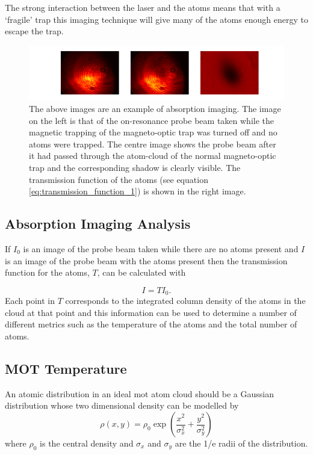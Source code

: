 The strong interaction between the laser and the atoms means that with a `fragile' trap this imaging technique will give many of the atoms enough energy to escape the trap.

\begin{figure}[h]
\centering
\includegraphics[width=18cm]{figs/absorptionexample.pdf}
\caption{The above images are an example of absorption imaging.  The image on the left is that of the on-resonance probe beam taken while the magnetic trapping of the magneto-optic trap was turned off and no atoms were trapped. The centre image shows the probe beam after it had passed through the atom-cloud of the normal magneto-optic trap and the corresponding shadow is clearly visible. The transmission function of the atoms (see equation \ref{eq:transmission_function_1}) is shown in the right image.}
\label{fig:absorption_example}
\end{figure}

\subsection{Absorption Imaging Analysis}
\label{sec:absorption_imaging}
If $I_0$ is an image of the probe beam taken while there are no atoms present and $I$ is an image of the probe beam with the atoms present then the transmission function for the atoms, $T$, can be calculated with

\begin{equation}\label{eq:transmission_function_1}
I = T I_0.
\end{equation}
Each point in $T$ corresponds to the integrated column density of the atoms in the cloud at that point and this information can be used to determine a number of different metrics such as the temperature of the atoms and the total number of atoms.

\subsection{MOT Temperature}
An atomic distribution in an ideal \gls{mot} atom cloud should be a Gaussian distribution whose two dimensional density can be modelled by
\begin{equation}\label{eq:gaussian_density}
\rho (x, y) = \rho_0\exp\left(\frac{x^2}{\sigma_x^2} + \frac{y^2}{\sigma_y^2}\right)
\end{equation}
where $\rho_0$ is the central density and $\sigma_x$ and $\sigma_y$ are the 1/e radii of the distribution.

